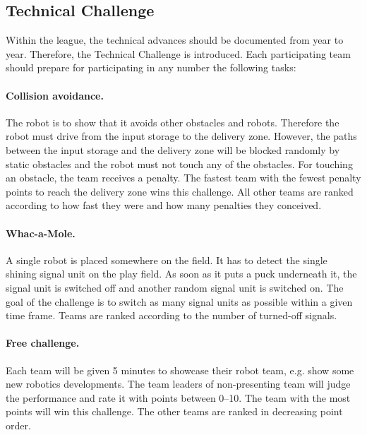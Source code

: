 \documentclass[12pt,twoside]{article}
\begin{document}
  \subsection{Technical Challenge}
  
  Within the league, the technical advances should be documented from
  year to year. Therefore, the Technical Challenge is introduced.
  Each participating team should prepare for participating in any
  number the following tasks:


  \paragraph{Collision avoidance.~}
  The robot is to show that it avoids other obstacles and robots.
  Therefore the robot must drive from the input storage to the delivery zone.
  However, the paths between the input storage and the delivery zone will
  be blocked randomly by static obstacles and the robot must not touch any
  of the obstacles. For touching an obstacle, the team receives a penalty.
  The fastest team with the fewest penalty points to reach the delivery
  zone wins this challenge. All other teams are ranked according to
  how fast they were and how many penalties they conceived.
  
  \paragraph{Whac-a-Mole.~}
  A single robot is placed somewhere on the field. It has to detect
  the single shining signal unit on the play field. As soon as it puts
  a puck underneath it, the signal unit is switched off and another
  random signal unit is switched on. The goal of the challenge is to
  switch as many signal units as possible within a given time
  frame. Teams are ranked according to the number of turned-off
  signals.
  

  \paragraph{Free challenge.~}
  Each team will be given 5 minutes to showcase their robot team, e.g.
  show some new robotics developments. The team leaders of
  non-presenting team will judge the performance and rate it with
  points between 0--10.  The team with the most points will win this
  challenge. The other teams are ranked in decreasing point order.
\end{document}
